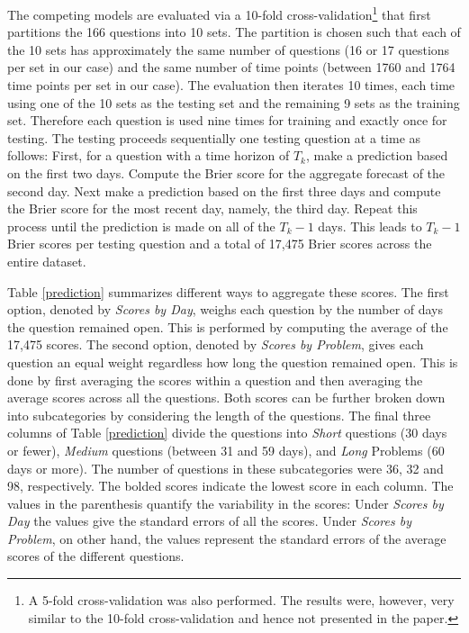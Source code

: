 \documentclass[aoas, preprint]{imsart}
\numberwithin{equation}{section}
\theoremstyle{plain}
\begin{document}
\begin{enumerate}
\begin{enumerate}
\end{enumerate}
\end{enumerate}



The competing models are evaluated via a 10-fold cross-validation\footnote{A 5-fold cross-validation was also performed. The results were, however, very similar to the 10-fold cross-validation and hence not presented in the paper.} that first partitions the 166 questions into 10 sets. The partition is chosen such that each of the 10 sets has approximately the same number of questions (16 or 17 questions per set in our case) and the same number of time points (between 1760 and 1764 time points per set in our case). The evaluation then iterates 10 times, each time using one of the 10 sets as the testing set and the remaining 9 sets as the training set. Therefore each question is used nine times for training and exactly once for testing. The testing proceeds sequentially one testing question at a time as follows: First, for a question with a time horizon of $T_k$, make a prediction based on the first two days. Compute the Brier score for the aggregate forecast of the second day. Next make a prediction based on the first three days and  compute the Brier score for the most recent day, namely, the third day. Repeat this process until the prediction is made on all of the $T_k-1$ days. This leads to $T_k-1$ Brier scores per testing question and a total of  17,475 Brier scores across the entire dataset. 


Table \ref{prediction} summarizes different ways to aggregate these scores. The first option, denoted by \textit{Scores by Day}, weighs each question by the number of days the question remained open. This is performed by computing the average of the 17,475 scores. The second option, denoted by \textit{Scores by Problem}, gives each question an equal weight regardless how long the question remained open. This is done by first averaging the scores within a question and then averaging the average scores across all the questions. Both scores can be further broken down into subcategories by considering the length of the questions. The final three columns of Table \ref{prediction} divide the questions into \textit{Short} questions (30 days or fewer), \textit{Medium} questions (between 31 and 59 days), and \textit{Long} Problems (60 days or more). The number of questions in these subcategories were 36, 32 and 98, respectively. The bolded scores indicate the lowest score in each column. The values in the parenthesis quantify the variability in the scores: Under \textit{Scores by Day} the values give the standard errors of all the scores. Under \textit{Scores by Problem}, on other hand, the values represent the standard errors of the average scores of the different questions. 
\end{document}
